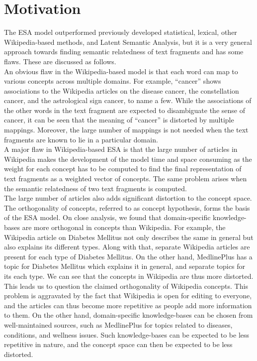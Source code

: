 \documentclass[journal,transmag]{IEEEtran}
\begin{document}
\section{\textbf{Motivation}}
The ESA model outperformed previously developed statistical, lexical, other Wikipedia-based methods, and Latent Semantic Analysis, but it is a very general approach towards finding semantic relatedness of text fragments and has some flaws. These are discussed as follows.\\
An obvious flaw in the Wikipedia-based model is that each word can map to various concepts across multiple domains. For example, ``cancer'' shows associations to the Wikipedia articles on the disease cancer, the constellation cancer, and the astrological sign cancer, to name a few. While the associations of the other words in the text fragment are expected to disambiguate the sense of cancer, it can be seen that the meaning of ``cancer'' is distorted by multiple mappings. Moreover, the large number of mappings is not needed when the text fragments are known to lie in a particular domain.\\
A major flaw in Wikipedia-based ESA is that the large number of articles in Wikipedia makes the development of the model time and space consuming as the weight for each concept has to be computed to find the final representation of text fragments as a weighted vector of concepts. The same problem arises when the semantic relatedness of two text fragments is computed.\\
The large number of articles also adds significant distortion to the concept space. The orthogonality of concepts, referred to as concept hypothesis, forms the basis of the ESA model. On close analysis, we found that domain-specific knowledge-bases are more orthogonal in concepts than Wikipedia. For example, the Wikipedia article on Diabetes Mellitus not only describes the same in general but also explains its different types. Along with that, separate Wikipedia articles are present for each type of Diabetes Mellitus. On the other hand, MedlinePlus has a topic for Diabetes Mellitus which explains it in general, and separate topics for its each type. We can see that the concepts in Wikipedia are thus more distorted. This leads us to question the claimed orthogonality of Wikipedia concepts. This problem is aggravated by the fact that Wikipedia is open for editing to everyone, and the articles can thus become more repetitive as people add more information to them. On the other hand, domain-specific knowledge-bases can be chosen from well-maintained sources, such as MedlinePlus for topics related to diseases, conditions, and wellness issues. Such knowledge-bases can be expected to be less repetitive in nature, and the concept space can then be expected to be less distorted.\\
\end{document}
